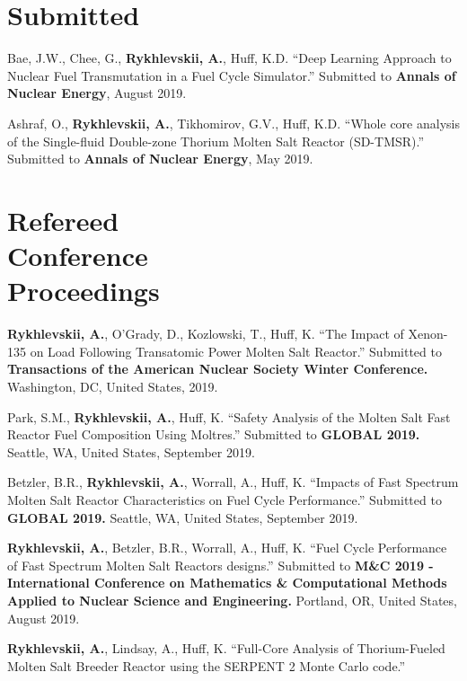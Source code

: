 \documentclass[margin,line]{resume}
\begin{document}
\begin{resume}
	\section{\mysidestyle Submitted}
	\begin{bibenum}
		\item Bae, J.W., Chee, G., \textbf{Rykhlevskii, A.}, Huff, K.D. ``Deep 
		Learning Approach to Nuclear Fuel Transmutation in a Fuel Cycle 
		Simulator.'' Submitted to \textbf{Annals of 
		Nuclear Energy}, August 2019.
		\item Ashraf, O., \textbf{Rykhlevskii, A.}, Tikhomirov, G.V., Huff, 
		K.D. ``Whole core analysis of the Single-fluid Double-zone Thorium 
		Molten Salt Reactor (SD-TMSR).'' Submitted to \textbf{Annals of 
		Nuclear Energy}, May 2019.
	\end{bibenum}
    \section{\mysidestyle Refereed\\Conference\\Proceedings}
    \begin{bibenum}
     \item \textbf{Rykhlevskii, A.}, O'Grady, D., Kozlowski, T., Huff, K. 
     ``The Impact of Xenon-135 on Load Following Transatomic Power Molten Salt 
     Reactor.'' Submitted to 
		 \textbf{Transactions of the American Nuclear Society Winter 
		 Conference.} Washington, DC, United States, 2019.
     \item Park, S.M., \textbf{Rykhlevskii, A.}, Huff, K. 
	``Safety Analysis of the Molten Salt Fast Reactor Fuel Composition Using 
	Moltres.'' Submitted to \textbf{GLOBAL 2019.} Seattle, WA, United 
	States,	September 2019.    
     \item Betzler, B.R., \textbf{Rykhlevskii, A.}, Worrall, A., Huff, K. 
     ``Impacts of Fast Spectrum Molten Salt Reactor Characteristics on Fuel 
     Cycle Performance.'' Submitted to \textbf{GLOBAL 2019.} Seattle, WA, 
     United States, September 2019.    
    \item \textbf{Rykhlevskii, A.}, Betzler, B.R., Worrall, A., Huff, K. ``Fuel Cycle Performance of Fast Spectrum Molten Salt Reactors designs.'' Submitted to \textbf{M\&C 2019 - International Conference on Mathematics \& Computational Methods Applied to Nuclear Science and Engineering.} 
            Portland, OR, United States, August 2019.    
    \item \textbf{Rykhlevskii, A.}, Lindsay, A., Huff, K. ``Full-Core Analysis of Thorium-Fueled Molten Salt Breeder Reactor using the SERPENT 2 Monte Carlo code.'' 

\end{bibenum}
\end{resume}
\end{document}
